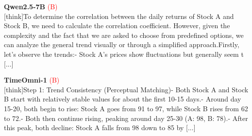 \noindent
\begin{minipage}[t]{0.28\textwidth}
\colorbox{red!8}{\parbox{\dimexpr\textwidth-2\fboxsep}{
\textbf{Qwen2.5-7B} \textcolor{red}{(B)} \\[2pt]
\tiny
[think]To determine the correlation between the daily returns of Stock A and Stock B, we need to calculate the correlation coefficient. However, given the complexity and the fact that we are asked to choose from predefined options, we can analyze the general trend visually or through a simplified approach.\newline Firstly, let's observe the trends:\newline - Stock A's prices show fluctuations but generally seem t [...]
}}
\end{minipage}
\hfill
\begin{minipage}[t]{0.28\textwidth}
\colorbox{red!8}{\parbox{\dimexpr\textwidth-2\fboxsep}{
\textbf{TimeOmni-1} \textcolor{red}{(B)} \\[2pt]
\tiny
[think]\newline Step 1: Trend Consistency (Perceptual Matching)\newline - Both Stock A and Stock B start with relatively stable values for about the first 10-15 days.\newline - Around day 15-20, both begin to rise: Stock A goes from  91 to  97, while Stock B rises from  62 to  72.\newline - Both then continue rising, peaking around day 25-30 (A:  98, B:  78).\newline - After this peak, both decline: Stock A falls from  98 down to  85 by [...]
}}
\end{minipage}
\hfill
